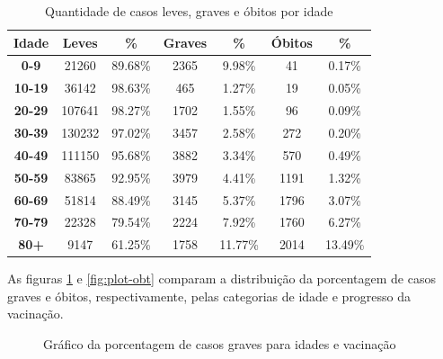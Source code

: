 \begin{table}[H]
  \centering
  \begin{tabular}{|c|c|c|c|c|c|c|}
  \hline
  \textbf{Idade} & \textbf{Leves} & \textbf{\%} & \textbf{Graves} & \textbf{\%} & \textbf{Óbitos} & \textbf{\%} \\ \hline
  \textbf{0-9}   & 21260          & 89.68\%           & 2365            & 9.98\%             & 41              & 0.17\%             \\ \hline
  \textbf{10-19} & 36142          & 98.63\%           & 465             & 1.27\%             & 19              & 0.05\%             \\ \hline
  \textbf{20-29} & 107641         & 98.27\%           & 1702            & 1.55\%             & 96              & 0.09\%             \\ \hline
  \textbf{30-39} & 130232         & 97.02\%           & 3457            & 2.58\%             & 272             & 0.20\%             \\ \hline
  \textbf{40-49} & 111150         & 95.68\%           & 3882            & 3.34\%             & 570             & 0.49\%             \\ \hline
  \textbf{50-59} & 83865          & 92.95\%           & 3979            & 4.41\%             & 1191            & 1.32\%             \\ \hline
  \textbf{60-69} & 51814          & 88.49\%           & 3145            & 5.37\%             & 1796            & 3.07\%             \\ \hline
  \textbf{70-79} & 22328          & 79.54\%           & 2224            & 7.92\%             & 1760            & 6.27\%             \\ \hline
  \textbf{80+}   & 9147           & 61.25\%           & 1758            & 11.77\%            & 2014            & 13.49\%            \\ \hline
  \end{tabular}
  \caption{Quantidade de casos leves, graves e óbitos por idade}
  \label{tbl:tabela-idade-severidade}
  \end{table}

As figuras \ref{fig:plot-sev} e \ref{fig:plot-obt} comparam a distribuição da porcentagem de casos graves e óbitos, respectivamente, pelas categorias de idade e progresso da vacinação.

\begin{figure}[ht!]
  \centering
  \caption{\textmd{Gráfico da porcentagem de casos graves para idades e vacinação}}
  \label{fig:plot-sev}
\end{figure}

